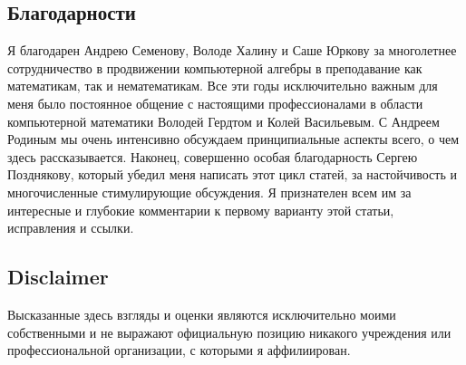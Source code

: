 \documentclass[intlimits,twoside,a4paper,11pt]{article}
\begin{document}
		\subsection{Благодарности}
		Я благодарен Андрею Семенову, Володе Халину и Саше Юркову за многолетнее 
		сотрудничество в продвижении компьютерной алгебры в преподавание как
		математикам, так и нематематикам.
		Все эти годы исключительно важным для меня было постоянное общение с 
		настоящими профессионалами в области компьютерной математики Володей 
		Гердтом и Колей Васильевым. С Андреем Родиным мы очень интенсивно 
		обсуждаем принципиальные аспекты всего, о чем здесь рассказывается.
		Наконец, совершенно особая благодарность Сергею Позднякову, который убедил 
		меня написать этот цикл статей, за настойчивость и многочисленные 
		стимулирующие обсуждения. Я признателен всем им за интересные и глубокие 
		комментарии к первому варианту этой статьи, исправления и ссылки.
		


\subsection{Disclaimer}
Высказанные здесь взгляды и оценки являются исключительно моими собственными
и не выражают официальную позицию никакого учреждения или профессиональной
организации, с которыми я аффилиирован.

\end{document}

